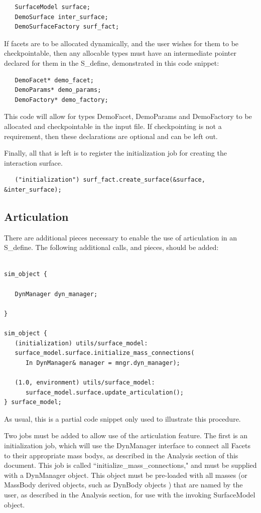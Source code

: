 \begin{verbatim}
   SurfaceModel surface;
   DemoSurface inter_surface;
   DemoSurfaceFactory surf_fact;
\end{verbatim}

If facets are to be allocated dynamically, and the user wishes for them to be checkpointable, then
any allocable types must have an intermediate pointer declared for them in the S\_define, demonstrated
in this code snippet:

\begin{verbatim}
   DemoFacet* demo_facet; 
   DemoParams* demo_params;
   DemoFactory* demo_factory;
\end{verbatim}

This code will allow for types DemoFacet, DemoParams and DemoFactory to be allocated and checkpointable
in the input file. If checkpointing is not a requirement, then these declarations are optional and can
be left out.

Finally, all that is left is to register the initialization job for creating the interaction surface.

\begin{verbatim}
   ("initialization") surf_fact.create_surface(&surface, &inter_surface);
\end{verbatim}

\subsection{Articulation}

There are additional pieces necessary to enable the use of articulation
in an S\_define. The following additional calls, and pieces, should be added:

\begin{verbatim}

sim_object {

   DynManager dyn_manager;

}

sim_object {
   (initialization) utils/surface_model:
   surface_model.surface.initialize_mass_connections(
      In DynManager& manager = mngr.dyn_manager);

   (1.0, environment) utils/surface_model:
      surface_model.surface.update_articulation();
} surface_model;
\end{verbatim}

As usual, this is a partial code snippet only used to illustrate this procedure.

Two jobs must be added to allow use of the articulation feature. The first is an
initialization job, which will use the DynManager interface to connect all
Facets to their appropriate mass bodys, as described in the Analysis section of this document.
This job is called ``initialize\_mass\_connections," and must be supplied with a DynManager
object. This object must be pre-loaded with all masses (or MassBody derived objects, such as
DynBody objects \cite{dynenv:DYNBODY}) that are named by the user, as described in the Analysis section,
for use with the invoking SurfaceModel object.

